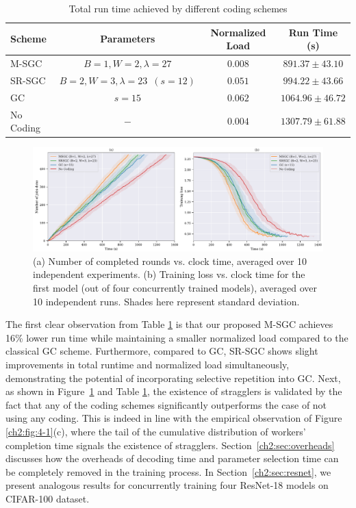 \begin{table}[h]
\caption{Total run time achieved by different coding schemes} \label{ch2:table:4-1}
\centering
\renewcommand{\arraystretch}{1.2}
\begin{tabular}{lccc}
    \toprule
    \multicolumn{1}{l}{\bf Scheme}  &\multicolumn{1}{c}{\bf Parameters} &\multicolumn{1}{c}{\bf Normalized Load} &\multicolumn{1}{c}{\bf Run Time (s)} \\
    \midrule
    M-SGC	   	&$B=1, W=2, \lambda=27$	&$0.008$    &$891.37 \pm 43.10 $\\
    SR-SGC	   	&$B=2, W=3, \lambda=23 \; \ (s=12)$	&$0.051$    &$994.22 \pm 43.66 $\\
    GC	       	&$s=15$	                &$0.062$    &$1064.96 \pm 46.72$ \\
    No Coding	&$-$	                &$0.004$    &$1307.79 \pm 61.88$ \\
    \bottomrule
\end{tabular}
\end{table}

\begin{figure}[h]
    \centering
    \includegraphics[width=\textwidth]{figs/ch2/fig2.pdf}
    \caption{(a) Number of completed rounds vs. clock time, averaged over 10 independent experiments. (b) Training loss vs. clock time for the first model (out of four concurrently trained models), averaged over 10 independent runs. Shades here represent standard deviation.}
    \label{ch2:fig:4-2}
\end{figure}

The first clear observation from Table \ref{ch2:table:4-1} is that our proposed M-SGC achieves 16\% lower run time while maintaining a smaller normalized load compared to the classical GC scheme. Furthermore, compared to GC, SR-SGC shows slight improvements in total runtime and normalized load simultaneously, demonstrating the potential of incorporating selective repetition into GC. Next, as shown in Figure~\ref{ch2:fig:4-2} and Table \ref{ch2:table:4-1}, the existence of stragglers is validated by the fact that any of the coding schemes significantly outperforms the case of not using any coding. This is indeed in line with the empirical observation of Figure \ref{ch2:fig:4-1}(c), where the tail of the cumulative distribution of workers' completion time signals the existence of stragglers. Section~\ref{ch2:sec:overheads} discusses how the overheads of decoding time and parameter selection time can be completely removed in the training process. In Section~\ref{ch2:sec:resnet}, we present analogous results for concurrently training four ResNet-18 models on CIFAR-100 dataset.

